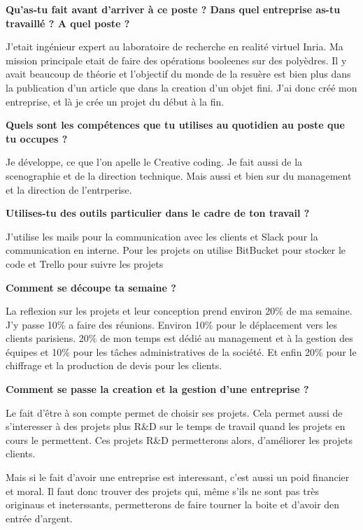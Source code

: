 \documentclass{article}
\newcommand{\question}[1]{\medskip\noindent\textbf{#1}\medskip}
\begin{document}
    \question{Qu'as-tu fait avant d'arriver à ce poste ? Dans quel entreprise as-tu travaillé ? A quel poste ?}

    J'etait ingénieur expert au laboratoire de recherche en realité virtuel Inria.
    Ma mission principale etait de faire des opérations booleenes sur des polyèdres.
    Il y avait beaucoup de théorie et l'objectif du monde de la resuère est bien plus dans la publication d'un article que dans la creation d'un objet fini.
    J'ai donc créé mon entreprise, et là je crée un projet du début à la fin.

    \question{Quels sont les compétences que tu utilises au quotidien au poste que tu occupes ?}

    Je développe, ce que l'on apelle le Creative coding.
    Je fait aussi de la scenographie et de la direction technique.
    Mais aussi et bien sur du management et la direction de l'entrperise.

    \question{Utilises-tu des outils particulier dans le cadre de ton travail ?}

    J'utilise les mails pour la communication avec les clients et Slack pour la communication en interne.
    Pour les projets on utilise BitBucket pour stocker le code et Trello pour suivre les projets

    \question{Comment se découpe ta semaine ?}

    La reflexion sur les projets et leur conception prend environ 20\% de ma semaine.
    J'y passe 10\% a faire des réunions.
    Environ 10\% pour le déplacement vers les clients parisiens.
    20\% de mon temps est dédié au management et à la gestion des équipes et 10\% pour les tâches administratives de la société.
    Et enfin 20\% pour le chiffrage et la production de devis pour les clients.

    \question{Comment se passe la creation et la gestion d'une entreprise ?}

    Le fait d'être à son compte permet de choisir ses projets.
    Cela permet aussi de s'interesser à des projets plus R\&D sur le temps de travail quand les projets en cours le permettent.
    Ces projets R\&D permetterons alors, d'améliorer les projets clients.

    Mais si le fait d'avoir une entreprise est interessant, c'est aussi un poid financier et moral.
    Il faut donc trouver des projets qui, même s'ils ne sont pas très originaus et ineterssants, permetterons de faire tourner la boite et d'avoir den entrée d'argent.
\end{document}
